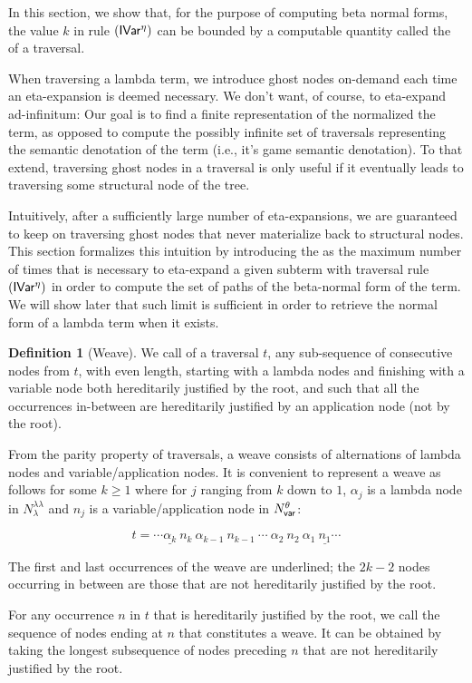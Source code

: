 \documentclass{article}
\theoremstyle{definition}
\newtheorem{definition}{Definition}[section]
\newcommand\NodesVar{N_{\sf var}}%
\newcommand\NodesLmd{N_\lambda}%
\newcommand{\ghostlmd}{{\lambda\!\!\lambda}}
\newcommand{\ghostvar}{\theta}
\begin{document}
In this section, we show that, for the purpose of computing beta normal forms, the value $k$ in rule $\mathbf{({\sf IVar^\eta})}$ can be bounded by a computable quantity called the  of a traversal.

When traversing a lambda term, we introduce ghost nodes on-demand each time an eta-expansion is deemed necessary.
We don't want, of course, to eta-expand ad-infinitum: Our goal is to find a finite representation of the normalized the term, as opposed to compute the possibly infinite set of traversals representing the semantic denotation of the term (i.e., it's game semantic denotation). To that extend, traversing ghost nodes in a traversal is only useful if it eventually leads to traversing some structural node of the tree.

Intuitively, after a sufficiently large number of eta-expansions, we are guaranteed to keep on traversing ghost nodes that never materialize back to structural nodes. This section formalizes this intuition by introducing the  as the maximum number of times that is necessary to eta-expand a given subterm with traversal rule $\mathbf{({\sf IVar^\eta})}$ in order to compute the set of paths of the beta-normal form of the term. We will show later that such limit is sufficient in order to retrieve the normal form of a lambda term when it exists.

\begin{definition}[Weave]
We call  of a traversal $t$, any sub-sequence of consecutive nodes from $t$,
with even length, starting with a lambda nodes and finishing with a variable node both hereditarily justified by the root, and such that all the occurrences in-between are hereditarily justified by an application node (\ie not by the root).

From the parity property of traversals, a weave consists of alternations of lambda nodes and variable/application nodes. It is convenient to represent a weave as follows for some $k\geq 1$ where for $j$ ranging from $k$ down to $1$, $\alpha_j$ is a lambda node in $\NodesLmd^\ghostlmd$ and $n_j$ is a variable/application node in $\NodesVar^\ghostvar$:

$$ t = \cdots \underline{\alpha_k}\ n_k\ \alpha_{k-1}\ n_{k-1}\ \cdots\ \alpha_2\ n_2\ \alpha_1\ \underline{n_1} \cdots $$

The first and last occurrences of the weave are underlined; the $2k-2$ nodes occurring in between are those that are not hereditarily justified by the root.

For any occurrence $n$ in $t$ that is hereditarily justified by the root, we call  the sequence of nodes ending at $n$ that constitutes a weave. It can be obtained by taking the longest subsequence of nodes preceding $n$ that are not hereditarily justified by the root.
\end{definition}
\end{document}
